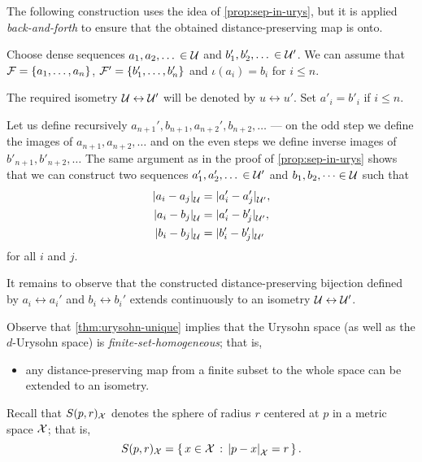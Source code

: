 The following construction uses the idea of \ref{prop:sep-in-urys}, but it is applied {}\emph{back-and-forth} to ensure that the obtained distance-preserving map is onto.

Choose dense sequences $a_1,a_2,\dots{}\in \mathcal{U}$ and $b'_1,b'_2,\dots{}\in \mathcal{U}'$.
We can assume that $\mathcal{F}=\{a_1,\dots,a_n\}$, $\mathcal{F}'=\{b_1',\dots,b_n'\}$ and $\iota(a_i)=b_i$ for $i\le n$.

The required isometry $\mathcal{U}\leftrightarrow \mathcal{U}'$ will be denoted by $u \leftrightarrow u'$.
Set $a'_i=b'_i$ if $i\le n$.

Let us define recursively $a_{n+1}',b_{n+1}, a_{n+2}', b_{n+2},\dots$ --- on the odd step we define the images of $a_{n+1},a_{n+2},\dots$ and on the even steps we define inverse images of $b'_{n+1},b'_{n+2},\dots$
The same argument as in the proof of \ref{prop:sep-in-urys} shows that we can construct two sequences $a_1',a_2',\dots{}\in \mathcal{U}'$ and $b_1,b_2,\dots\in \mathcal{U}$ such that
\begin{align*}
\dist{a_i}{a_j}{\spc{U}}&=\dist{a_i'}{a_j'}{\spc{U}'},
\\
\dist{a_i}{b_j}{\spc{U}}&=\dist{a_i'}{b_j'}{\spc{U}'},
\\
\dist{b_i}{b_j}{\spc{U}}&=\dist{b_i'}{b_j'}{\spc{U}'}
\end{align*}
for all $i$ and $j$.

It remains to observe that the constructed distance-preserving bijection defined by $a_i\leftrightarrow a_i'$ and $b_i\leftrightarrow b_i'$ extends
continuously to an isometry $\mathcal{U}\leftrightarrow \mathcal{U}'$. 
\qeds

Observe that \ref{thm:urysohn-unique} implies that the Urysohn space (as well as the $d$-Urysohn space) is \emph{finite-set-homogeneous}; that is,
\begin{itemize}
 \item any distance-preserving map from a finite subset to the whole space can be extended to an isometry.
\end{itemize}

Recall that $S(p,r)_{\mathcal{X}}$ denotes the sphere of radius $r$ centered at $p$ in a metric space $\mathcal{X}$;
that is, 
$$S(p,r)_{\spc{X}}=\set{x\in \spc{X}}{\dist{p}{x}{\spc{X}}=r}.$$

